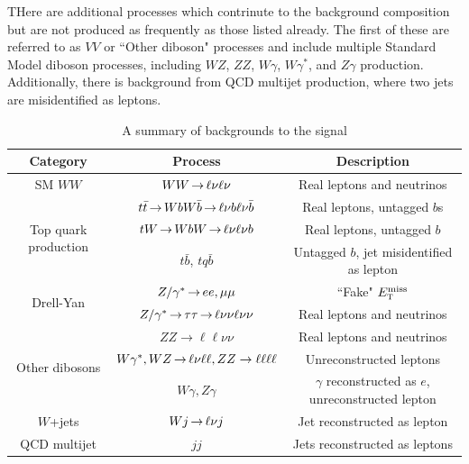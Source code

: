THere are additional processes which contrinute to the background composition but are not produced as frequently as those listed already. The first of these are referred to as $VV$ or ``Other diboson" processes and include multiple Standard Model diboson processes, including $WZ$, $ZZ$, $W\gamma$, $W\gamma^{*}$, and $Z\gamma$ production. Additionally, there is background from QCD multijet production, where two jets are misidentified as leptons. 

\begin{table}[h!]
\centering
\captionsetup{justification=centering}

\hspace{-10pt}
{\renewcommand{\arraystretch}{1.15}
\begin{tabular}{|c|c|c|}
\hline
Category & Process & Description \\ \hline
SM $WW$ & $WW\,{\rightarrow}\,\ell\nu\ell\nu$ & Real leptons and neutrinos \\ \hline
\multirow{3}{*}{Top quark production} & $t\bar{t}\,{\rightarrow}\, WbW\bar{b}\,{\rightarrow}\,\ell\nu b \ell\nu \bar{b}$ & Real leptons, untagged $b$s \\ 
 & $tW \,{\rightarrow}\, WbW \,{\rightarrow}\, \ell\nu\ell\nu b $ & Real leptons, untagged $b$ \\ 
 & $t\bar{b}$, $tq\bar{b}$ & Untagged $b$, jet misidentified as lepton \\ \hline

 \multirow{2}{*}{Drell-Yan} & $Z/\gamma^{\ast}\,{\rightarrow}\, ee, \mu\mu$ & ``Fake" $E_{\textrm{\footnotesize\sc t}}^{\rm miss}$ \\ 
  & $Z/\gamma^{\ast}\,{\rightarrow}\, \tau\tau \,{\rightarrow}\, \ell\nu\nu \ell\nu\nu $& Real leptons and neutrinos \\ \hline

  \multirow{3}{*}{Other dibosons} & $ZZ \to \ell\ell \nu\nu$ & Real leptons and neutrinos \\ 
   & $W\gamma^{*}, WZ \,{\rightarrow}\, \ell\nu\ell\ell, ZZ \to \ell\ell\ell\ell$ & Unreconstructed leptons \\ 
   & $W\gamma, Z\gamma$ & $\gamma$ reconstructed as $e$, unreconstructed lepton \\ \hline

   $W$+jets & $Wj \,{\rightarrow}\, \ell\nu j$ & Jet reconstructed as lepton \\ \hline
   QCD multijet & $jj$ & Jets reconstructed as leptons \\ \hline
 
 \hline
\end{tabular}
}
\caption{
  A summary of backgrounds to the \HWWfull signal 
}
\label{tab:bkgtable}
\end{table}


